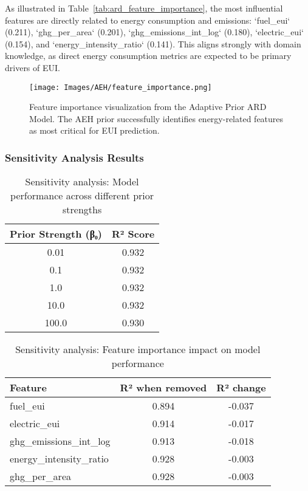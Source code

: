 As illustrated in Table~\ref{tab:ard_feature_importance}, the most influential features are directly related to energy consumption and emissions: `fuel\_eui` (0.211), `ghg\_per\_area` (0.201), `ghg\_emissions\_int\_log` (0.180), `electric\_eui` (0.154), and `energy\_intensity\_ratio` (0.141). This aligns strongly with domain knowledge, as direct energy consumption metrics are expected to be primary drivers of EUI.

\begin{figure}[ht]
    \centering
    \texttt{[image: Images/AEH/feature\_importance.png]}
    \caption{Feature importance visualization from the Adaptive Prior ARD Model. The AEH prior successfully identifies energy-related features as most critical for EUI prediction.}
    \label{fig:feature_importance_bar_plot}
\end{figure}

\subsubsection{Sensitivity Analysis Results}

\begin{table}[h]
\centering
\caption{Sensitivity analysis: Model performance across different prior strengths}
\label{tab:sensitivity_prior_strength}
\begin{tabular}{|c|c|}
\hline
\textbf{Prior Strength (β₀)} & \textbf{R² Score} \\
\hline
0.01 & 0.932 \\
0.1 & 0.932 \\
1.0 & 0.932 \\
10.0 & 0.932 \\
100.0 & 0.930 \\
\hline
\end{tabular}
\end{table}

\begin{table}[h]
\centering
\caption{Sensitivity analysis: Feature importance impact on model performance}
\label{tab:sensitivity_feature_importance}
\begin{tabular}{|l|c|c|}
\hline
\textbf{Feature} & \textbf{R² when removed} & \textbf{R² change} \\
\hline
fuel\_eui & 0.894 & -0.037 \\
electric\_eui & 0.914 & -0.017 \\
ghg\_emissions\_int\_log & 0.913 & -0.018 \\
energy\_intensity\_ratio & 0.928 & -0.003 \\
ghg\_per\_area & 0.928 & -0.003 \\
\hline
\end{tabular}
\end{table}

